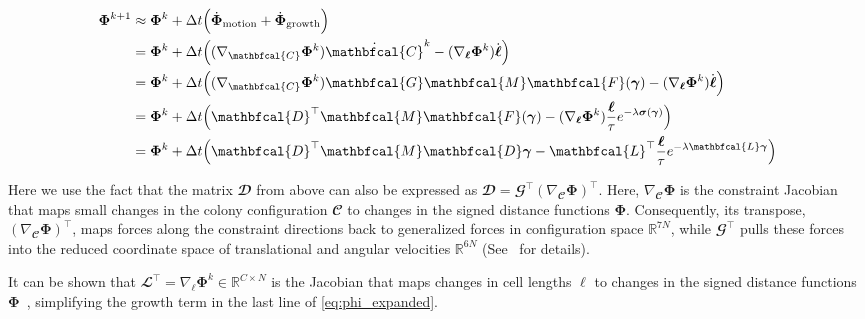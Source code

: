 \documentclass[conference]{IEEEtran}
\begin{document}
\begin{equation}\label{eq:phi_expanded}
    \small
    \begin{split}
        \mathbf{\Phi}^{k+1} & \approx \mathbf{\Phi}^k + \Delta t \Bigl( \dot{\mathbf{\Phi}}_{\text{motion}} + \dot{\mathbf{\Phi}}_{\text{growth}} \Bigr)\\
        & = \mathbf{\Phi}^k + \Delta t \Bigl( (\nabla_{\mathbfcal{C}} \mathbf{\Phi}^k) \dot{\mathbfcal{C}}^k - (\nabla_{\boldsymbol{\ell}} \mathbf{\Phi}^k) \dot{\boldsymbol{\ell}} \Bigr)\\
        & = \mathbf{\Phi}^k + \Delta t \Bigl( (\nabla_{\mathbfcal{C}} \mathbf{\Phi}^k) \mathbfcal{G} \mathbfcal{M}  \mathbfcal{F}(\boldsymbol{\gamma}) - (\nabla_{\boldsymbol{\ell}} \mathbf{\Phi}^k) \dot{\boldsymbol{\ell}} \Bigr)\\
        & = \mathbf{\Phi}^k + \Delta t \Bigl( \mathbfcal{D}^\top \mathbfcal{M}  \mathbfcal{F}(\boldsymbol{\gamma}) - (\nabla_{\boldsymbol{\ell}} \mathbf{\Phi}^k) \frac{\boldsymbol{\ell}}{\tau} e^{-\lambda  \boldsymbol{\sigma}(\boldsymbol{\gamma})} \Bigr)\\
        & = \mathbf{\Phi}^k + \Delta t \Bigl( \mathbfcal{D}^\top \mathbfcal{M} \mathbfcal{D} \boldsymbol{\gamma} - \mathbfcal{L}^\top \frac{\boldsymbol{\ell}}{\tau} e^{-\lambda \mathbfcal{L} \boldsymbol{\gamma}} \Bigr)
    \end{split}
\end{equation}


Here we use the fact that the matrix $\mathbfcal{D}$ from above can also be expressed as $\mathbfcal{D} = \mathbfcal{G}^\top (\nabla_{\mathbfcal{C}} \mathbf{\Phi})^\top$. Here, $\nabla_{\mathbfcal{C}} \mathbf{\Phi}$ is the constraint Jacobian that maps small changes in the colony configuration $\mathbfcal{C}$ to changes in the signed distance functions $\mathbf{\Phi}$. Consequently, its transpose, $(\nabla_{\mathbfcal{C}} \mathbf{\Phi})^\top$, maps forces along the constraint directions back to generalized forces in configuration space $\mathbb{R}^{7N}$, while $\mathbfcal{G}^\top$ pulls these forces into the reduced coordinate space of translational and angular velocities $\mathbb{R}^{6N}$ (See~\cite{Weady2024SM, Tasora2008} for details).

It can be shown that $\mathbfcal{L}^\top = \nabla_{\boldsymbol{\ell}} \mathbf{\Phi}^k \in \mathbb{R}^{C \times N}$ is the Jacobian that maps changes in cell lengths $\boldsymbol{\ell}$ to changes in the signed distance functions $\mathbf{\Phi}$~\cite{Weady2024SM}, simplifying the growth term in the last line of \autoref{eq:phi_expanded}.
\end{document}
